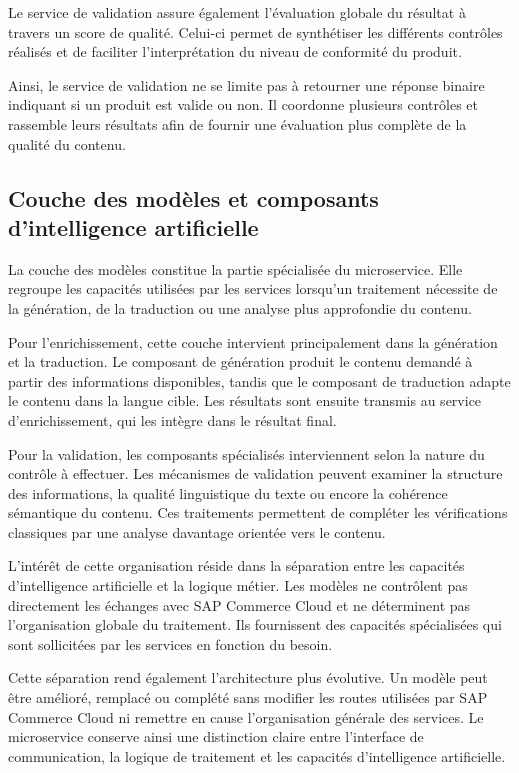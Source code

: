 Le service de validation assure également l'évaluation globale du résultat à travers un score de qualité. Celui-ci permet de synthétiser les différents contrôles réalisés et de faciliter l'interprétation du niveau de conformité du produit.

Ainsi, le service de validation ne se limite pas à retourner une réponse binaire indiquant si un produit est valide ou non. Il coordonne plusieurs contrôles et rassemble leurs résultats afin de fournir une évaluation plus complète de la qualité du contenu.

\subsection{Couche des modèles et composants d'intelligence artificielle}

La couche des modèles constitue la partie spécialisée du microservice. Elle regroupe les capacités utilisées par les services lorsqu'un traitement nécessite de la génération, de la traduction ou une analyse plus approfondie du contenu.

Pour l'enrichissement, cette couche intervient principalement dans la génération et la traduction. Le composant de génération produit le contenu demandé à partir des informations disponibles, tandis que le composant de traduction adapte le contenu dans la langue cible. Les résultats sont ensuite transmis au service d'enrichissement, qui les intègre dans le résultat final.

Pour la validation, les composants spécialisés interviennent selon la nature du contrôle à effectuer. Les mécanismes de validation peuvent examiner la structure des informations, la qualité linguistique du texte ou encore la cohérence sémantique du contenu. Ces traitements permettent de compléter les vérifications classiques par une analyse davantage orientée vers le contenu.

L'intérêt de cette organisation réside dans la séparation entre les capacités d'intelligence artificielle et la logique métier. Les modèles ne contrôlent pas directement les échanges avec SAP Commerce Cloud et ne déterminent pas l'organisation globale du traitement. Ils fournissent des capacités spécialisées qui sont sollicitées par les services en fonction du besoin.

Cette séparation rend également l'architecture plus évolutive. Un modèle peut être amélioré, remplacé ou complété sans modifier les routes utilisées par SAP Commerce Cloud ni remettre en cause l'organisation générale des services. Le microservice conserve ainsi une distinction claire entre l'interface de communication, la logique de traitement et les capacités d'intelligence artificielle.

